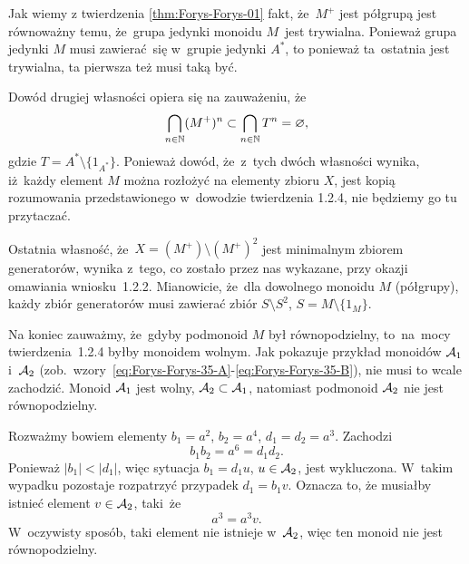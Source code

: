 \documentclass[a4paper,11pt]{article}
\begin{document}
Jak wiemy z twierdzenia \eqref{thm:Forys-Forys-01} fakt, że~$M^{ + }$ jest
półgrupą jest równoważny temu, że~grupa jedynki monoidu $M$~jest trywialna.
Ponieważ grupa jedynki $M$ musi zawierać~się w~grupie jedynki $A^{ * }$, to
ponieważ ta~ostatnia jest trywialna, ta pierwsza też musi taką być.

Dowód drugiej własności opiera się na zauważeniu, że
\begin{equation}
  \label{eq:Forys-Forys-67}
  \bigcap_{ n \in \mathbb{N} } ( M^{ + } )^{ n } \subset \bigcap_{ n \in \mathbb{N} } T^{ n } = \varnothing,
\end{equation}
gdzie $T = A^{ * } \setminus \{ 1_{ A^{ * } } \}$. Ponieważ dowód, że~z~tych dwóch
własności wynika, iż~każdy element $M$ można rozłożyć na elementy zbioru
$X$, jest kopią rozumowania przedstawionego w~dowodzie twierdzenia 1.2.4,
nie będziemy go tu przytaczać.

Ostatnia własność, że~$X = ( M^{ + } ) \setminus ( M^{ + } )^{ 2 }$ jest minimalnym
zbiorem generatorów, wynika z~tego, co zostało przez nas wykazane, przy
okazji omawiania wniosku~1.2.2. Mianowicie, że~dla dowolnego monoidu $M$
(półgrupy), każdy zbiór generatorów musi zawierać zbiór $S \setminus S^{ 2 }$,
$S = M \setminus \{ 1_{ M } \}$.

Na koniec zauważmy, że~gdyby podmonoid $M$ był równopodzielny, to~na~mocy
twierdzenia~1.2.4 byłby monoidem wolnym. Jak pokazuje przykład monoidów
$\mathcal{A}_{ 1 }$ i~$\mathcal{A}_{ 2 }$
(zob.~wzory~\eqref{eq:Forys-Forys-35-A}-\eqref{eq:Forys-Forys-35-B}),
nie musi to wcale zachodzić. Monoid $\mathcal{A}_{ 1 }$ jest wolny,
$\mathcal{A}_{ 2 } \subset \mathcal{A}_{ 1 }$, natomiast podmonoid $\mathcal{A}_{ 2 }$ nie jest
równopodzielny.

Rozważmy bowiem elementy $b_{ 1 } = a^{ 2 }$, $b_{ 2 } = a^{ 4 }$,
$d_{ 1 } = d_{ 2 } = a^{ 3 }$. Zachodzi
\begin{equation}
  \label{eq:Forys-Forys-68}
  b_{ 1 } b_{ 2 } = a^{ 6 } = d_{ 1 } d_{ 2 }.
\end{equation}
Ponieważ $| b_{ 1 } | < | d_{ 1 } |$, więc sytuacja $b_{ 1 } = d_{ 1 } u$,
$u \in \mathcal{A}_{ 2 }$, jest wykluczona. W~takim wypadku pozostaje rozpatrzyć
przypadek $d_{ 1 } = b_{ 1 } v$. Oznacza to, że musiałby istnieć element
$v \in \mathcal{A}_{ 2 }$, taki~że
\begin{equation}
  \label{eq:Forys-Forys-69}
  a^{ 3 } = a^{ 3 } v.
\end{equation}
W~oczywisty sposób, taki element nie istnieje w~$\mathcal{A}_{ 2 }$, więc ten
monoid nie jest równopodzielny.
\end{document}
